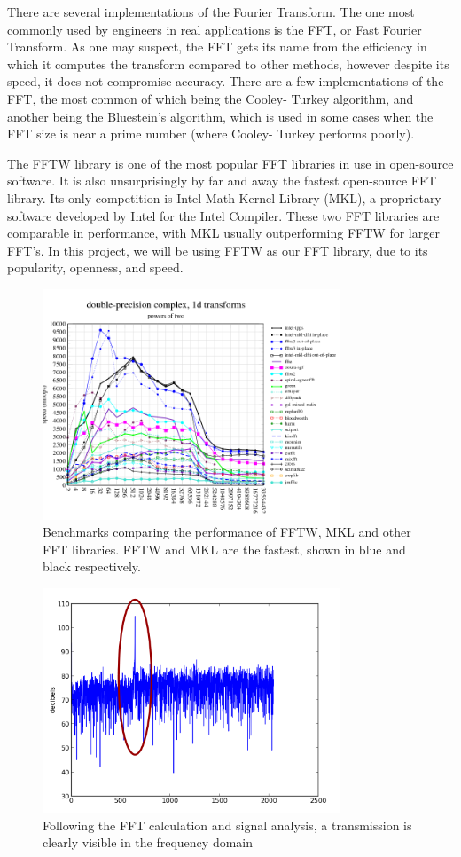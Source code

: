 \documentclass[conference]{IEEEtran}
\begin{document}
There are several implementations of the Fourier Transform. The one most
commonly used by engineers in real applications is the FFT, or Fast
Fourier Transform. As one may suspect, the FFT gets its name from the
efficiency in which it computes the transform compared to other methods,
however despite its speed, it does not compromise accuracy. There are a 
few implementations of the FFT, the most common of which being the Cooley-
Turkey algorithm, and another being the Bluestein's algorithm, which is
used in some cases when the FFT size is near a prime number (where Cooley-
Turkey performs poorly). 

The FFTW library is one of the most popular FFT libraries in use in
open-source software. It is also unsurprisingly by far and away the fastest open-source
FFT library. Its only competition is Intel Math Kernel Library (MKL),
a proprietary software developed by Intel for the Intel Compiler. These
two FFT libraries are comparable in performance, with MKL usually outperforming
FFTW for larger FFT's. In this project, we will be using FFTW as our 
FFT library, due to its popularity, openness, and speed.

\begin{figure}[ht!]
\centering
\includegraphics[width=3.5in]{fftwmkl.png}
\caption{Benchmarks comparing the performance of FFTW, MKL and other FFT libraries. FFTW and MKL are the fastest, shown in blue and black respectively. \cite{fftw:benchmarks}}
\label{fig:fftwmkl}
\end{figure}


\begin{figure}[ht!]
\centering
\includegraphics[width=3.5in]{signalgraph.png}
\caption{Following the FFT calculation and signal analysis, a transmission is clearly visible in the frequency domain}
\label{fig:pipeline}
\end{figure}
\end{document}
